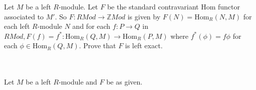 Let $M$ be a left $R$-module. Let $F$ be the standard contravariant Hom functor associated to $M'$. So
$F:RMod\to \mathbb{Z}Mod$ is given by $F(N)=\text{Hom}_R(N,M)$ for each left $R$-module $N$ and for each
$f:P\to Q$ in $RMod, F(f)=f^*:\text{Hom}_R(Q,M)\to\text{Hom}_R(P,M)$ where $f^*(\phi)=f\phi$ for each
$\phi\in\text{Hom}_R(Q,M)$. Prove that $F$ is left exact.\\\\

\begin{solution}\renewcommand{\qedsymbol}{}\ \\
    Let $M$ be a left $R$-module and $F$ be as given.
\end{solution}